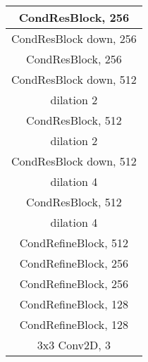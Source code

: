 \documentclass{article}
\begin{document}
\begin{table}[h]
\begin{subtable}[t]{0.3\linewidth}
\begin{tabular}{c}
    \midrule
    CondResBlock, 256\\
    \midrule
    CondResBlock down, 256 \\
    \midrule
    CondResBlock, 256 \\
    \midrule
    CondResBlock down, 512\\ dilation 2\\
    \midrule
    CondResBlock, 512\\ dilation 2\\
    \midrule
    CondResBlock down, 512\\ dilation 4\\
    \midrule
    CondResBlock, 512 \\ dilation 4\\
    \midrule
    CondRefineBlock, 512\\
    \midrule
    CondRefineBlock, 256\\
    \midrule
    CondRefineBlock, 256\\
    \midrule
    CondRefineBlock, 128\\
    \midrule
    CondRefineBlock, 128\\
    \midrule
    3x3 Conv2D, 3\\
    \bottomrule
    \end{tabular}
    \end{subtable}
\end{table}
\end{document}
